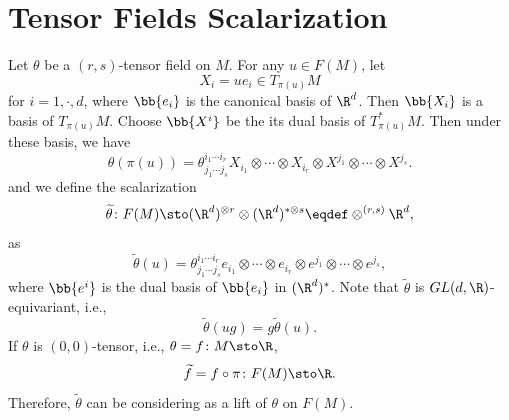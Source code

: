 \section{Tensor Fields Scalarization}

Let $\theta$ be a $(r,s)$-tensor field on $M$. For any $u \in F(M)$, let
\begin{equation*}
    X_i = ue_i \in T_{\pi(u)}M
\end{equation*}
for $i = 1,\cdot,d$, where $\bb{e_i}$ is the canonical basis of $\R^d$. Then $\bb{X_i}$ is a basis of $T_{\pi(u)}M$. Choose $\bb{X^i}$ be the its dual basis of $T^*_{\pi(u)}M$. Then under these basis, we have
\begin{equation*}
    \theta(\pi(u)) = \theta^{i_1\cdots i_r}_{j_1\cdots j_s}X_{i_1} \otimes \cdots \otimes X_{i_r} \otimes X^{j_1} \otimes \cdots \otimes X^{j_s}.
\end{equation*}
and we define the scalarization
\begin{equation*}
    \widetilde{\theta} \colon F(M) \sto (\R^d)^{\otimes r} \otimes (\R^d)^{*\otimes s} \eqdef \otimes^{(r,s)} \R^d,
\end{equation*}
as
\begin{equation*}
    \widetilde{\theta}(u) = \theta^{i_1\cdots i_r}_{j_1\cdots j_s}e_{i_1} \otimes \cdots \otimes e_{i_r} \otimes e^{j_1} \otimes \cdots \otimes e^{j_s},
\end{equation*}
where $\bb{e^i}$ is the dual basis of $\bb{e_i}$ in $(\R^d)^*$. Note that $\widetilde{\theta}$ is $GL(d,\R)$-equivariant, i.e.,
\begin{equation*}
    \widetilde{\theta}(ug) = g \tilde{\theta}(u).
\end{equation*}
If $\theta$ is $(0,0)$-tensor, i.e., $\theta = f \colon M \sto \R$,
\begin{equation*}
    \widetilde{f} = f \circ \pi \colon F(M) \sto  \R.
\end{equation*}
Therefore, $\widetilde{\theta}$ can be considering as a lift of $\theta$ on $F(M)$.


